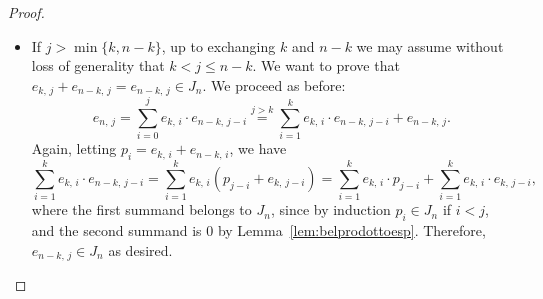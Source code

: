 \documentclass[11pt]{article}
\newcommand{\F}[0]{\mathbb{F}}
\newcommand{\es}[2]{e_{#1,\, #2}}
\theoremstyle{plain}
\theoremstyle{definition}
\theoremstyle{remark}
\begin{document}
\begin{proof}
\begin{itemize}
        Let $p_i=\es{k}{i}+\es{n-k}{i}$. One has
        \begin{equation*}
            q_j=\sum\limits_{i=1}^{j-1}\es{k}{i}(p_{j-i}+\es{k}{j-i})=\sum\limits_{i=1}^{j-1}\es{k}{i}\cdot p_{j-i}+\sum\limits_{i=1}^{j-1}\es{k}{i}\cdot\es{k}{j-i}.
        \end{equation*}
        The first sum, that we denote by $p'_j$, belongs to $J_n$, since $p_i\in J_n$ for all $i=1,\dots,j-1$ by the induction hypothesis. By Lemma~\ref{lem:belprodottoesp}, the second sum equals $\alpha\es{k}{j}$, for some $\alpha\in\mathbb{F}_2$.
        If $\alpha=0$, then $q_j=p_j'\in J_n$. If $\alpha=1$, then $q_j=p'_j+\es{k}{j}$, and therefore $\es{n}{j}=\es{k}{j}+q_j+\es{n-k}{j}=p'_j+\es{n-k}{j}$, which implies that $\es{n-k}{j}\in J_n$. In addition,
        \begin{equation*}
            q_j=\sum\limits_{i=1}^{j-1}(p_i+\es{n-k}{i})\es{n-k}{j-i}=\sum\limits_{i=1}^{j-1}p_i\cdot\es{n-k}{j-i}+\sum\limits_{i=1}^{j-1}\es{n-k}{i}\cdot\es{n-k}{j-i}.
        \end{equation*}
        Let $p''_j$ denote the first sum, then $p''_j\in J_n$ as before and the second sum is $\alpha\es{n-k}{j}$, for the same $t\in\F_2$ as above, since the bit check of Lemma~\ref{lem:belprodottoesp} involves the same pairs $(i,j-i)$. Since $\alpha=1$, we obtain $q_j=p''_j+\es{n-k}{j}\in J_n$. This concludes the proof. 

        \item If $j>\min\{k,n-k\}$, up to exchanging $k$ and $n-k$ we may assume without loss of generality that $k<j\leq n-k$. We want to prove that $\es{k}{j}+\es{n-k}{j}=\es{n-k}{j}\in J_n$. We proceed as before:
        \begin{equation*}
            \es{n}{j}=\sum\limits_{i=0}^j\es{k}{i}\cdot\es{n-k}{j-i}\overset{j>k}{=}\sum\limits_{i=1}^k\es{k}{i}\cdot\es{n-k}{j-i}+\es{n-k}{j}.
        \end{equation*}
        Again, letting $p_i=\es{k}{i}+\es{n-k}{i}$, we have
        \begin{equation*}
            \sum\limits_{i=1}^k\es{k}{i}\cdot\es{n-k}{j-i}=\sum\limits_{i=1}^k\es{k}{i}(p_{j-i}+\es{k}{j-i})=\sum\limits_{i=1}^k\es{k}{i}\cdot p_{j-i}+\sum\limits_{i=1}^k\es{k}{i}\cdot\es{k}{j-i},
        \end{equation*}
        where the first summand belongs to $J_n$, since by induction $p_i\in J_n$ if $i<j$, and the second summand is $0$ by Lemma~\ref{lem:belprodottoesp}. Therefore, $\es{n-k}{j}\in J_n$ as desired.
    \end{itemize}


\end{proof}
\end{document}

